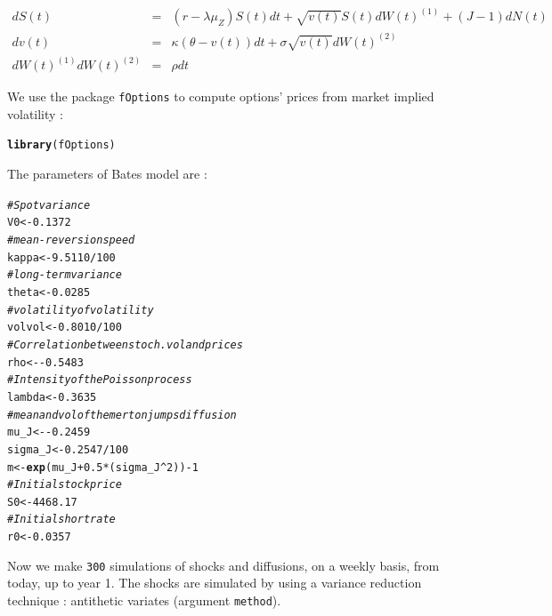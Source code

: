 \documentclass[a4paper]{article}\usepackage[]{graphicx}\usepackage[]{color}
\makeatletter
\newcommand{\hlnum}[1]{\textcolor[rgb]{0.686,0.059,0.569}{#1}}%
\newcommand{\hlcom}[1]{\textcolor[rgb]{0.678,0.584,0.686}{\textit{#1}}}%
\newcommand{\hlopt}[1]{\textcolor[rgb]{0,0,0}{#1}}%
\newcommand{\hlstd}[1]{\textcolor[rgb]{0.345,0.345,0.345}{#1}}%
\newcommand{\hlkwb}[1]{\textcolor[rgb]{0.69,0.353,0.396}{#1}}%
\newcommand{\hlkwd}[1]{\textcolor[rgb]{0.737,0.353,0.396}{\textbf{#1}}}%
\newenvironment{kframe}{%
 \def\at@end@of@kframe{}%
 \ifinner\ifhmode%
  \def\at@end@of@kframe{\end{minipage}}%
  \begin{minipage}{\columnwidth}%
 \fi\fi%
 \def\FrameCommand##1{\hskip\@totalleftmargin \hskip-\fboxsep
 \colorbox{shadecolor}{##1}\hskip-\fboxsep
     \hskip-\linewidth \hskip-\@totalleftmargin \hskip\columnwidth}%
 \MakeFramed {\advance\hsize-\width
   \@totalleftmargin\z@ \linewidth\hsize
   \@setminipage}}%
 {\par\unskip\endMakeFramed%
 \at@end@of@kframe}
\newenvironment{knitrout}{}{} %
\newcommand{\code}[1]{\mbox{\texttt{#1}}}
\makeatother
\begin{document}
\begin{eqnarray*}
\label{eq:batesmodel}
dS(t) &=& (r - \lambda \mu_Z) S(t) dt + \sqrt{v(t)} S(t) dW(t)^{(1)} + (J - 1) dN(t)\\
dv(t) &=& \kappa(\theta - v(t)) dt + \sigma \sqrt{v(t)} dW(t)^{(2)}\\
dW(t)^{(1)} dW(t)^{(2)} &=& \rho dt
\end{eqnarray*}

We use the package \code{fOptions} to compute options' prices from market implied volatility : 
\begin{knitrout}
\color{fgcolor}\begin{kframe}
\begin{alltt}
\hlkwd{library}\hlstd{(fOptions)}
\end{alltt}
\end{kframe}
\end{knitrout}

The parameters of Bates model are : 
\begin{knitrout}
\color{fgcolor}\begin{kframe}
\begin{alltt}
\hlcom{# Spot variance}
\hlstd{V0} \hlkwb{<-} \hlnum{0.1372}
\hlcom{# mean-reversion speed}
\hlstd{kappa} \hlkwb{<-} \hlnum{9.5110}\hlopt{/}\hlnum{100}
\hlcom{# long-term variance}
\hlstd{theta} \hlkwb{<-} \hlnum{0.0285}
\hlcom{# volatility of volatility}
\hlstd{volvol} \hlkwb{<-} \hlnum{0.8010}\hlopt{/}\hlnum{100}
\hlcom{# Correlation between stoch. vol and prices}
\hlstd{rho} \hlkwb{<-} \hlopt{-}\hlnum{0.5483}
\hlcom{# Intensity of the Poisson process}
\hlstd{lambda} \hlkwb{<-} \hlnum{0.3635}
\hlcom{# mean and vol of the merton jumps diffusion}
\hlstd{mu_J} \hlkwb{<-} \hlopt{-}\hlnum{0.2459}
\hlstd{sigma_J} \hlkwb{<-} \hlnum{0.2547}\hlopt{/}\hlnum{100}
\hlstd{m} \hlkwb{<-} \hlkwd{exp}\hlstd{(mu_J} \hlopt{+} \hlnum{0.5}\hlopt{*}\hlstd{(sigma_J}\hlopt{^}\hlnum{2}\hlstd{))} \hlopt{-} \hlnum{1}
\hlcom{# Initial stock price}
\hlstd{S0} \hlkwb{<-} \hlnum{4468.17}
\hlcom{# Initial short rate}
\hlstd{r0} \hlkwb{<-} \hlnum{0.0357}
\end{alltt}
\end{kframe}
\end{knitrout}

Now we make \code{300} simulations of shocks and diffusions, on a weekly basis, from today, up to year 1. The shocks are simulated by using a variance reduction technique : antithetic variates (argument \code{method}). 
\end{document}
